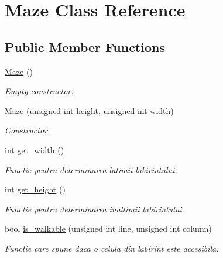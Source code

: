 \hypertarget{classMaze}{
\section{Maze Class Reference}
\label{classMaze}
}
\subsection*{Public Member Functions}
\begin{DoxyCompactItemize}
\item 
\hypertarget{classMaze_a7ecf1da4b9685f97bf3110a8479e724b}{
\hyperlink{classMaze_a7ecf1da4b9685f97bf3110a8479e724b}{Maze} ()}
\label{classMaze_a7ecf1da4b9685f97bf3110a8479e724b}

\begin{DoxyCompactList}\small\item\em Empty constructor. \item\end{DoxyCompactList}\item 
\hyperlink{classMaze_aefe17a9230004f78133d5cee3fde7ff3}{Maze} (unsigned int height, unsigned int width)
\begin{DoxyCompactList}\small\item\em Constructor. \item\end{DoxyCompactList}\item 
int \hyperlink{classMaze_a3f9b79edb99a9726da62bc6823ea9149}{get\_\-width} ()
\begin{DoxyCompactList}\small\item\em Functie pentru determinarea latimii labirintului. \item\end{DoxyCompactList}\item 
int \hyperlink{classMaze_a43a3408e506b2f2463fc985865b3c850}{get\_\-height} ()
\begin{DoxyCompactList}\small\item\em Functie pentru determinarea inaltimii labirintului. \item\end{DoxyCompactList}\item 
bool \hyperlink{classMaze_ac93538707952b53de27238eea535ee54}{is\_\-walkable} (unsigned int line, unsigned int column)
\begin{DoxyCompactList}\small\item\em Functie care spune daca o celula din labirint este accesibila. \item\end{DoxyCompactList}\item 

\end{DoxyCompactItemize}
